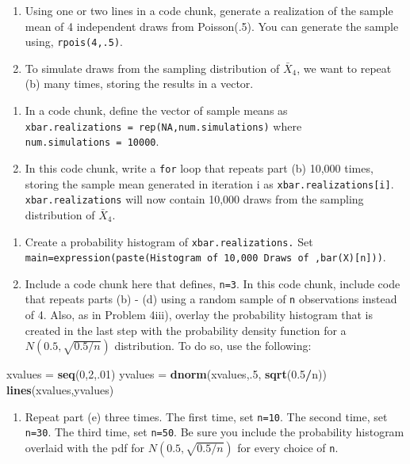 \documentclass[]{article}
\newenvironment{Shaded}{\begin{snugshade}}{\end{snugshade}}
\newcommand{\DecValTok}[1]{\textcolor[rgb]{0.00,0.00,0.81}{#1}}
\newcommand{\FloatTok}[1]{\textcolor[rgb]{0.00,0.00,0.81}{#1}}
\newcommand{\KeywordTok}[1]{\textcolor[rgb]{0.13,0.29,0.53}{\textbf{#1}}}
\newcommand{\NormalTok}[1]{#1}
\newcommand{\OperatorTok}[1]{\textcolor[rgb]{0.81,0.36,0.00}{\textbf{#1}}}
\newcommand{\StringTok}[1]{\textcolor[rgb]{0.31,0.60,0.02}{#1}}
\providecommand{\tightlist}{%
  \setlength{\itemsep}{0pt}\setlength{\parskip}{0pt}}
\begin{document}
\begin{enumerate}
\def\labelenumi{\alph{enumi})}
\setcounter{enumi}{1}
\item
  Using one or two lines in a code chunk, generate a realization of the
  sample mean of 4 independent draws from Poisson(.5). You can generate
  the sample using, \texttt{rpois(4,.5)}.
\item
  To simulate draws from the sampling distribution of \(\bar X_4\), we
  want to repeat (b) many times, storing the results in a vector.
\end{enumerate}

\begin{enumerate}
\def\labelenumi{(\roman{enumi})}
\item
  In a code chunk, define the vector of sample means as
  \texttt{xbar.realizations\ =\ rep(NA,num.simulations)} where
  \texttt{num.simulations\ =\ 10000}.
\item
  In this code chunk, write a \texttt{for} loop that repeats part (b)
  10,000 times, storing the sample mean generated in iteration i as
  \texttt{xbar.realizations{[}i{]}}. \texttt{xbar.realizations} will now
  contain 10,000 draws from the sampling distribution of \(\bar X_4\).
\end{enumerate}

\begin{enumerate}
\def\labelenumi{\alph{enumi})}
\setcounter{enumi}{3}
\item
  Create a probability histogram of \texttt{xbar.realizations.} Set
  \texttt{main=expression(paste(\textquotesingle{}Histogram\ of\ 10,000\ Draws\ of\ \textquotesingle{},bar(X){[}n{]}))}.
\item
  Include a code chunk here that defines, \texttt{n=3}. In this code
  chunk, include code that repeats parts (b) - (d) using a random sample
  of \texttt{n} observations instead of 4. Also, as in Problem 4iii),
  overlay the probability histogram that is created in the last step
  with the probability density function for a \(N(0.5,\sqrt{0.5/n})\)
  distribution. To do so, use the following:
\end{enumerate}

\begin{Shaded}
\begin{Highlighting}[]
\NormalTok{xvalues =}\StringTok{ }\KeywordTok{seq}\NormalTok{(}\DecValTok{0}\NormalTok{,}\DecValTok{2}\NormalTok{,.}\DecValTok{01}\NormalTok{)}
\NormalTok{yvalues =}\StringTok{ }\KeywordTok{dnorm}\NormalTok{(xvalues,.}\DecValTok{5}\NormalTok{, }\KeywordTok{sqrt}\NormalTok{(}\FloatTok{0.5}\OperatorTok{/}\NormalTok{n))}
\KeywordTok{lines}\NormalTok{(xvalues,yvalues)}
\end{Highlighting}
\end{Shaded}

\begin{enumerate}
\def\labelenumi{\alph{enumi})}
\setcounter{enumi}{5}
\tightlist
\item
  Repeat part (e) three times. The first time, set \texttt{n=10}. The
  second time, set \texttt{n=30}. The third time, set \texttt{n=50}. Be
  sure you include the probability histogram overlaid with the pdf for
  \(N(0.5,\sqrt{0.5/n})\) for every choice of \texttt{n}.
\end{enumerate}
\end{document}
